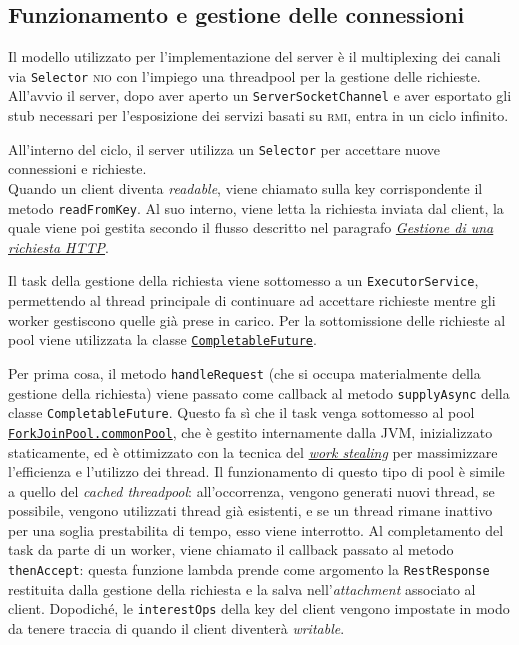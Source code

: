 \documentclass[a4paper,8pt]{article} %
\def\code#1{\texttt{#1}}
\begin{document}
\subsection{Funzionamento e gestione delle connessioni}
Il modello utilizzato per l'implementazione del server è il multiplexing dei canali via \code{Selector} \textsc{nio} con l'impiego una threadpool per la gestione delle richieste.
All'avvio il server, dopo aver aperto un \code{ServerSocketChannel} e aver esportato gli stub necessari per l'esposizione dei servizi basati su \textsc{rmi},
entra in un ciclo infinito.
\par All'interno del ciclo, il server utilizza un \code{Selector} per accettare nuove connessioni e richieste.
\\ Quando un client diventa \emph{readable}, viene chiamato sulla key corrispondente il metodo \code{readFromKey}. Al suo interno, viene letta la richiesta inviata dal client,
la quale viene poi gestita secondo il flusso descritto nel paragrafo \hyperref[sec:http_flow]{\emph{Gestione di una richiesta HTTP}}.

\par Il task della gestione della richiesta viene sottomesso a un \code{ExecutorService}, permettendo al thread principale di continuare ad accettare richieste mentre gli worker gestiscono quelle già prese in carico.
Per la sottomissione delle richieste al pool viene utilizzata la classe \href{https://docs.oracle.com/javase/8/docs/api/java/util/concurrent/CompletableFuture.html}{\code{CompletableFuture}}.
\par Per prima cosa, il metodo \code{handleRequest} (che si occupa materialmente della gestione della richiesta) viene passato come callback al metodo \code{supplyAsync} della classe \code{CompletableFuture}.
Questo fa sì che il task venga sottomesso al pool \href{https://medium.com/swlh/the-unfairly-unknown-forkjoinpool-c262777def6a}{\code{ForkJoinPool.commonPool}}, che è gestito internamente dalla JVM, inizializzato staticamente, ed è ottimizzato con la tecnica del \href{https://en.wikipedia.org/wiki/Work_stealing}{\emph{work stealing}} per massimizzare l'efficienza e l'utilizzo dei thread.
Il funzionamento di questo tipo di pool è simile a quello del \emph{cached threadpool}: all'occorrenza, vengono generati nuovi thread, se possibile, vengono utilizzati thread già esistenti, e se un thread rimane inattivo per una soglia prestabilita di tempo, esso viene interrotto.
Al completamento del task da parte di un worker, viene chiamato il callback passato al metodo \code{thenAccept}: questa funzione lambda prende come argomento la \code{RestResponse} restituita dalla gestione della richiesta e la salva nell'\emph{attachment} associato al client.
Dopodiché, le \code{interestOps} della key del client vengono impostate in modo da tenere traccia di quando il client diventerà \emph{writable}.
\end{document}
